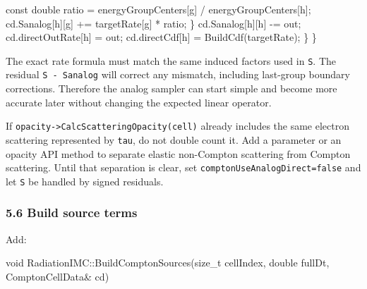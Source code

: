 \documentclass[
]{article}
\newenvironment{Shaded}{}{}
\newcommand{\AttributeTok}[1]{\textcolor[rgb]{0.49,0.56,0.16}{#1}}
\newcommand{\DataTypeTok}[1]{\textcolor[rgb]{0.56,0.13,0.00}{#1}}
\newcommand{\NormalTok}[1]{#1}
\newcommand{\OperatorTok}[1]{\textcolor[rgb]{0.40,0.40,0.40}{#1}}
\begin{document}
\begin{Shaded}
\begin{Highlighting}[]
            \AttributeTok{const} \DataTypeTok{double}\NormalTok{ ratio }\OperatorTok{=}\NormalTok{ energyGroupCenters}\OperatorTok{[}\NormalTok{g}\OperatorTok{]} \OperatorTok{/}\NormalTok{ energyGroupCenters}\OperatorTok{[}\NormalTok{h}\OperatorTok{];}
\NormalTok{            cd}\OperatorTok{.}\NormalTok{Sanalog}\OperatorTok{[}\NormalTok{h}\OperatorTok{][}\NormalTok{g}\OperatorTok{]} \OperatorTok{+=}\NormalTok{ targetRate}\OperatorTok{[}\NormalTok{g}\OperatorTok{]} \OperatorTok{*}\NormalTok{ ratio}\OperatorTok{;}
        \OperatorTok{\}}
\NormalTok{        cd}\OperatorTok{.}\NormalTok{Sanalog}\OperatorTok{[}\NormalTok{h}\OperatorTok{][}\NormalTok{h}\OperatorTok{]} \OperatorTok{{-}=}\NormalTok{ out}\OperatorTok{;}
\NormalTok{        cd}\OperatorTok{.}\NormalTok{directOutRate}\OperatorTok{[}\NormalTok{h}\OperatorTok{]} \OperatorTok{=}\NormalTok{ out}\OperatorTok{;}
\NormalTok{        cd}\OperatorTok{.}\NormalTok{directCdf}\OperatorTok{[}\NormalTok{h}\OperatorTok{]} \OperatorTok{=}\NormalTok{ BuildCdf}\OperatorTok{(}\NormalTok{targetRate}\OperatorTok{);}
    \OperatorTok{\}}
\OperatorTok{\}}
\end{Highlighting}
\end{Shaded}

The exact rate formula must match the same induced factors used in
\texttt{S}. The residual \texttt{S\ -\ Sanalog} will correct any
mismatch, including last-group boundary corrections. Therefore the
analog sampler can start simple and become more accurate later without
changing the expected linear operator.

If \texttt{opacity-\textgreater{}CalcScatteringOpacity(cell)} already
includes the same electron scattering represented by \texttt{tau}, do
not double count it. Add a parameter or an opacity API method to
separate elastic non-Compton scattering from Compton scattering. Until
that separation is clear, set \texttt{comptonUseAnalogDirect=false} and
let \texttt{S} be handled by signed residuals.

\subsubsection{5.6 Build source terms}\label{build-source-terms}

Add:

\begin{Shaded}
\begin{Highlighting}[]
\DataTypeTok{void}\NormalTok{ RadiationIMC}\OperatorTok{::}\NormalTok{BuildComptonSources}\OperatorTok{(}\DataTypeTok{size\_t}\NormalTok{ cellIndex}\OperatorTok{,} \DataTypeTok{double}\NormalTok{ fullDt}\OperatorTok{,}\NormalTok{ ComptonCellData}\OperatorTok{\&}\NormalTok{ cd}\OperatorTok{)}
\end{Highlighting}
\end{Shaded}
\end{document}
